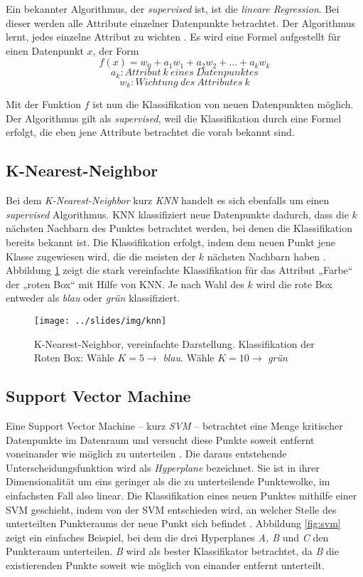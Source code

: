 Ein bekannter Algorithmus, der \textit{supervised} ist, ist die \textit{lineare Regression}. Bei dieser werden alle Attribute einzelner Datenpunkte betrachtet. Der Algorithmus lernt, jedes einzelne Attribut zu wichten \cite{datamining2011}. Es wird eine Formel aufgestellt für einen Datenpunkt $x$, der Form
\[
	f(x) = w_0 + a_1w_1 + a_2w_2 + ... + a_kw_k
\]
\[
	a_k : Attribut\ k\ eines\ Datenpunktes
\]
\[
	w_k : Wichtung\ des\ Attributes\ k
\]

Mit der Funktion $f$ ist nun die Klassifikation von neuen Datenpunkten möglich. Der Algorithmus gilt als \textit{supervised}, weil die Klassifikation durch eine Formel erfolgt, die eben jene Attribute betrachtet die vorab bekannt sind.

\subsection{K-Nearest-Neighbor}

Bei dem \textit{K-Nearest-Neighbor} kurz \textit{KNN} handelt es sich ebenfalls um einen \textit{supervised} Algorithmus. KNN klassifiziert neue Datenpunkte dadurch, dass die $k$ nächsten Nachbarn des Punktes betrachtet werden, bei denen die Klassifikation bereits bekannt ist. Die Klassifikation erfolgt, indem dem neuen Punkt jene Klasse zugewiesen wird, die die meisten der $k$ nächsten Nachbarn haben \cite{datamining2011}. Abbildung \ref{fig:knn} zeigt die stark vereinfachte Klassifikation für das Attribut „Farbe“ der „roten Box“ mit Hilfe von KNN. Je nach Wahl des $k$ wird die rote Box entweder als \textit{blau} oder \textit{grün} klassifiziert.

\begin{figure}[h]
    \centering
    \texttt{[image: ../slides/img/knn]}
    \caption{K-Nearest-Neighbor, vereinfachte Darstellung. Klassifikation der Roten Box: Wähle $K=5 \rightarrow$ \textit{blau}. Wähle $K=10 \rightarrow$ \textit{grün}\label{fig:knn}}
\end{figure}

\subsection{Support Vector Machine}

Eine Support Vector Machine -- kurz \textit{SVM} -- betrachtet eine Menge kritischer Datenpunkte im Datenraum und versucht diese Punkte soweit entfernt voneinander wie möglich zu unterteilen \cite{datamining2011}. Die daraus entstehende Unterscheidungsfunktion wird als \textit{Hyperplane} bezeichnet. Sie ist in ihrer Dimensionalität um eins geringer als die zu unterteilende Punktewolke, im einfachsten Fall also linear. Die Klassifikation eines neuen Punktes mithilfe einer SVM geschieht, indem von der SVM entschieden wird, an welcher Stelle des unterteilten Punkteraums der neue Punkt sich befindet \cite{datamining2011}. Abbildung \ref{fig:svm} zeigt ein einfaches Beispiel, bei dem die drei Hyperplanes \textit{A, B} und \textit{C} den Punkteraum unterteilen. \textit{B} wird als bester Klassifikator betrachtet, da \textit{B} die existierenden Punkte soweit wie möglich von einander entfernt unterteilt.

